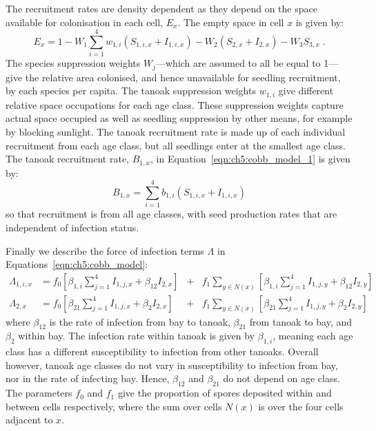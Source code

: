 The recruitment rates are density dependent as they depend on the space available for colonisation in each cell, $E_x$. The empty space in cell $x$ is given by:
\begin{equation}
    E_x = 1 - W_1\sum_{i=1}^4w_{1,i}\left(S_{1,i,x} + I_{1,i,x}\right) - W_2\left(S_{2,x} + I_{2,x}\right) - W_3S_{3,x} \;.
\end{equation}
The species suppression weights $W_j$---which are assumed to all be equal to 1---give the relative area colonised, and hence unavailable for seedling recruitment, by each species per capita. The tanoak suppression weights $w_{1,i}$ give different relative space occupations for each age class. These suppression weights capture actual space occupied as well as seedling suppression by other means, for example by blocking sunlight. The tanoak recruitment rate is made up of each individual recruitment from each age class, but all seedlings enter at the smallest age class. The tanoak recruitment rate, $B_{1,x}$, in Equation~\ref{eqn:ch5:cobb_model_1} is given by:
\begin{equation}\label{eqn:ch5:tanoak_recruit}
    B_{1,x} = \sum_{i=1}^4b_{1,i}\left(S_{1,i,x} + I_{1,i,x}\right)
\end{equation}
so that recruitment is from all age classes, with seed production rates that are independent of infection status.

Finally we describe the force of infection terms $\Lambda$ in Equations~\ref{eqn:ch5:cobb_model}:
\begin{subequations}\label{eqn:ch5:infection}
    \begin{alignat}{5}
        \Lambda_{1,i,x} &= f_0\left[\beta_{1,i}\sum_{j=1}^4I_{1,j,x} + \beta_{12}I_{2,x}\right] &+& f_1\sum_{y\in N(x)}\left[\beta_{1,i}\sum_{j=1}^4I_{1,j,y} + \beta_{12}I_{2,y}\right] \label{eqn:ch5:infection_1}\\
        \Lambda_{2,x} &= f_0\left[\beta_{21}\sum_{j=1}^4I_{1,j,x} + \beta_{2}I_{2,x}\right] &+& f_1\sum_{y\in N(x)}\left[\beta_{21}\sum_{j=1}^4I_{1,j,y} + \beta_{2}I_{2,y}\right] \label{eqn:ch5:infection_2}
    \end{alignat}
\end{subequations}
where $\beta_{12}$ is the rate of infection from bay to tanoak, $\beta_{21}$ from tanoak to bay, and $\beta_{2}$ within bay. The infection rate within tanoak is given by $\beta_{1,i}$, meaning each age class has a different susceptibility to infection from other tanoaks. Overall however, tanoak age classes do not vary in susceptibility to infection from bay, nor in the rate of infecting bay. Hence, $\beta_{12}$ and $\beta_{21}$ do not depend on age class. The parameters $f_0$ and $f_1$ give the proportion of spores deposited within and between cells respectively, where the sum over cells $N(x)$ is over the four cells adjacent to $x$.


